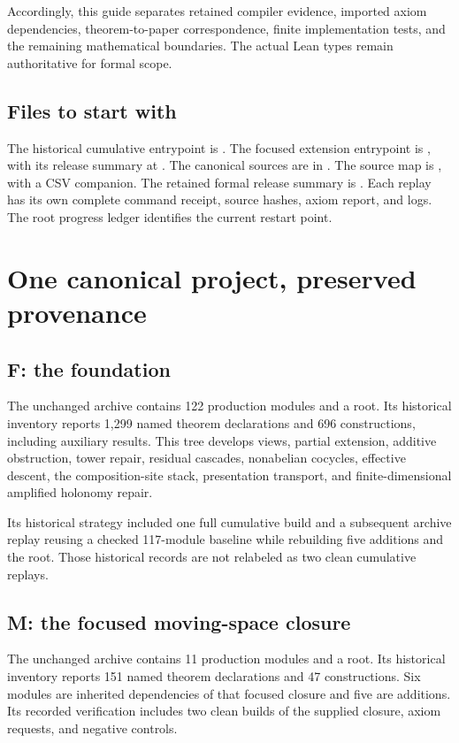 \documentclass[11pt]{article}
\begin{document}
Accordingly, this guide separates retained compiler evidence, imported axiom dependencies, theorem-to-paper correspondence, finite implementation tests, and the remaining mathematical boundaries. The actual Lean types remain authoritative for formal scope.

\subsection*{Files to start with}
The historical cumulative entrypoint is . The focused extension entrypoint is , with its release summary at . The canonical sources are in . The source map is , with a CSV companion. The retained formal release summary is . Each replay has its own complete command receipt, source hashes, axiom report, and logs. The root progress ledger identifies the current restart point.

\clearpage\section{One canonical project, preserved provenance}
\subsection{F: the foundation}
The unchanged archive  contains 122 production modules and a root. Its historical inventory reports 1,299 named theorem declarations and 696 constructions, including auxiliary results. This tree develops views, partial extension, additive obstruction, tower repair, residual cascades, nonabelian cocycles, effective descent, the composition-site stack, presentation transport, and finite-dimensional amplified holonomy repair.

Its historical strategy included one full cumulative build and a subsequent archive replay reusing a checked 117-module baseline while rebuilding five additions and the root. Those historical records are not relabeled as two clean cumulative replays.

\subsection{M: the focused moving-space closure}
The unchanged archive  contains 11 production modules and a root. Its historical inventory reports 151 named theorem declarations and 47 constructions. Six modules are inherited dependencies of that focused closure and five are additions. Its recorded verification includes two clean builds of the supplied closure, axiom requests, and negative controls.
\end{document}
